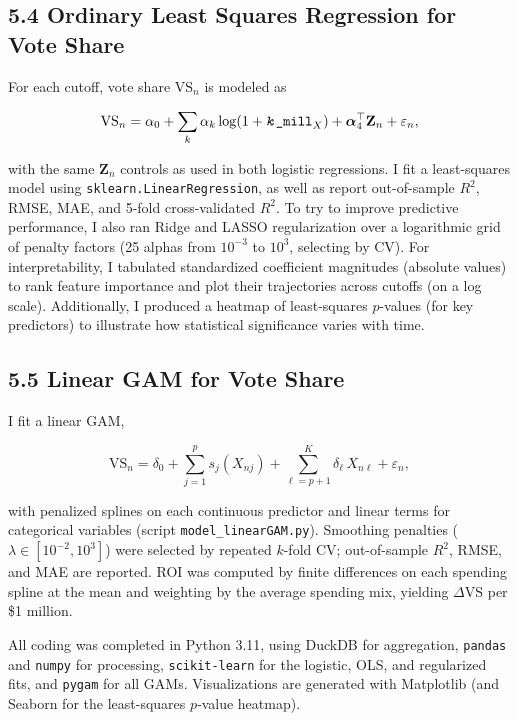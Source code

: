 \subsection*{5.4 Ordinary Least Squares Regression for Vote Share}

For each cutoff, vote share $\mathrm{VS}_n$ is modeled as

\[ \mathrm{VS}_n = \alpha_0 + \sum_{k} \alpha_k \log(1 + \texttt{\textit{k}\_mill}_X) + \boldsymbol{\alpha}_4^\top \mathbf{Z}_n + \varepsilon_n, \]

\noindent with the same $\mathbf{Z}_n$ controls as used in both logistic regressions. I fit a least-squares model using \texttt{sklearn.LinearRegression}, as well as report out-of-sample $R^2$, RMSE, MAE, and 5-fold cross-validated $R^2$. To try to improve predictive performance, I also ran Ridge and LASSO regularization over a logarithmic grid of penalty factors (25 alphas from $10^{-3}$ to $10^3$, selecting by CV). For interpretability, I tabulated standardized coefficient magnitudes (absolute values) to rank feature importance and plot their trajectories across cutoffs (on a log scale). Additionally, I produced a heatmap of least-squares $p$-values (for key predictors) to illustrate how statistical significance varies with time.

\subsection*{5.5 Linear GAM for Vote Share}

I fit a linear GAM,

\[ \mathrm{VS}_n = \delta_0 + \sum_{j=1}^p s_j(X_{nj}) + \sum_{\ell=p+1}^K \delta_\ell\, X_{n\ell} + \varepsilon_n, \]

\noindent with penalized splines on each continuous predictor and linear terms for categorical variables (script \texttt{model\_linearGAM.py}). Smoothing penalties ($\lambda \in [10^{-2}, 10^3]$) were selected by repeated $k$-fold CV; out-of-sample $R^2$, RMSE, and MAE are reported. ROI was computed by finite differences on each spending spline at the mean and weighting by the average spending mix, yielding $\Delta \mathrm{VS}$ per \$1 million.

\medskip
\indent All coding was completed in Python 3.11, using DuckDB for aggregation, \texttt{pandas} and \texttt{numpy} for processing, \texttt{scikit‑learn} for the logistic, OLS, and regularized fits, and \texttt{pygam} for all GAMs. Visualizations are generated with Matplotlib (and Seaborn for the least-squares $p$‑value heatmap).

